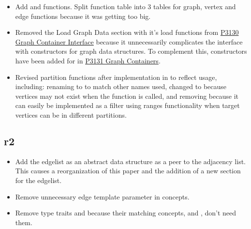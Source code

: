 \begin{itemize}
      \item Add  and  functions. Split function table into 3 tables for graph,
            vertex and edge functions because it was getting too big.
      \item Removed the Load Graph Data section with it's load functions from \href{https://www.wg21.link/P3130}{P3130 Graph Container Interface}
            because it unnecessarily complicates the interface with constructors for graph data structures. To complement this, constructors have 
            been added for  in \href{https://www.wg21.link/P3131}{P3131 Graph Containers}.
      \item Revised partition functions after implementation in  to reflect usage, including: 
            renaming  
            to  to match other names used, changed  to 
            because vertices may not exist when the function is called, and removing  because it can easily be 
            implemented as a filter using ranges functionality when target vertices can be in different partitions.
\end{itemize}

\subsection*{\paperno r2}

\begin{itemize}
      \item Add the edgelist as an abstract data structure as a peer to the adjacency list. 
            This causes a reorganization of this paper and the addition of a new section for the edgelist.
      \item Remove unnecessary  edge template parameter in concepts. 
      \item Remove type traits  and  because 
            their matching concepts,  and , don't need them.
\end{itemize}
